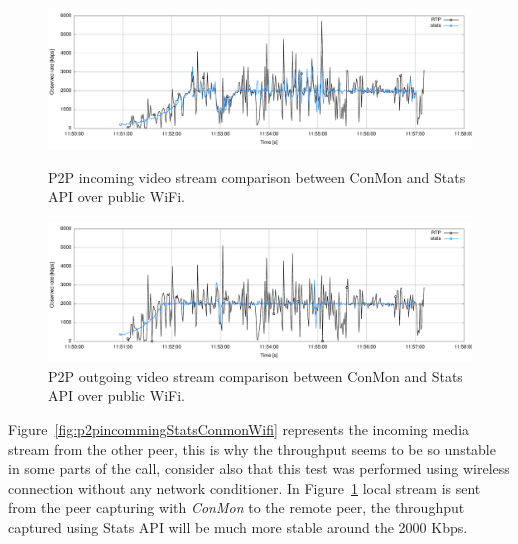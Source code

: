 \begin{figure}[h]
	\begin{minipage}{.5\textwidth}
		\includegraphics[width=1\textwidth]{./figures/p2pincommingStatsConmonWifi.pdf}
			\caption[P2P incoming video stream comparison between ConMon and Stats API over public WiFi]{P2P incoming video stream comparison between ConMon and Stats API over public WiFi.}
			\label{fig:p2pincommingStatsConmonWifi}
	 \end{minipage}
	 \begin{minipage}{.5\textwidth}
		\includegraphics[width=1\textwidth]{./figures/p2poutgoingStatsConmonWifi.pdf}
			\caption[P2P outgoing video stream comparison between ConMon and Stats API over public WiFi]{P2P outgoing video stream comparison between ConMon and Stats API over public WiFi.}
			\label{fig:p2poutgoingStatsConmonWifi}
	 \end{minipage}
\end{figure}

Figure~\ref{fig:p2pincommingStatsConmonWifi} represents the incoming media stream from the other peer, this is why the throughput seems to be so unstable in some parts of the call, consider also that this test was performed using wireless connection without any network conditioner. In Figure~\ref{fig:p2poutgoingStatsConmonWifi} local stream is sent from the peer capturing with {\it ConMon} to the remote peer, the throughput captured using Stats API will be much more stable around the 2000 Kbps.